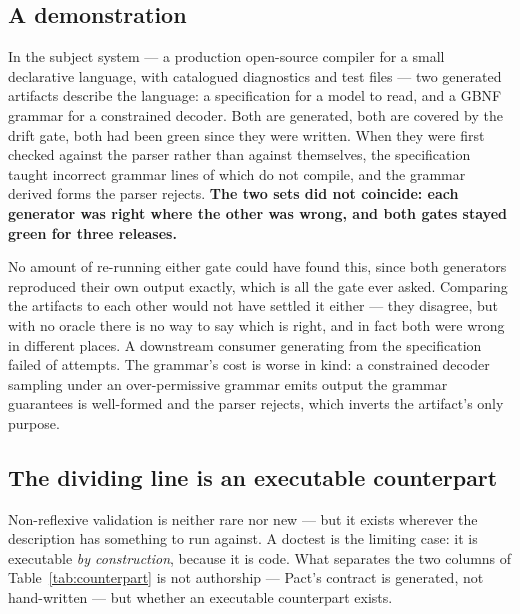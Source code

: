 \documentclass[10pt,conference]{IEEEtran}
\begin{document}
\subsection{A demonstration}

In the subject system --- a production open-source compiler for a small declarative
language, with \factErrorCodesTotal{} catalogued diagnostics and
\factTestFiles{} test files --- two generated artifacts describe the language: a
specification for a model to read, and a GBNF grammar for a constrained decoder. Both are
generated, both are covered by the drift gate, both had been green since they were
written. When they were first checked against the parser rather than against themselves,
the specification taught \factSpecBadLines{} incorrect grammar lines of which
\factSpecUncompilable{} do not compile, and the grammar derived
\factGbnfIllegalForms{} forms the parser rejects. \textbf{The two sets did not coincide:
each generator was right where the other was wrong, and both gates stayed green for three
releases.}

No amount of re-running either gate could have found this, since both generators
reproduced their own output exactly, which is all the gate ever asked. Comparing the
artifacts to each other would not have settled it either --- they disagree, but with no
oracle there is no way to say which is right, and in fact both were wrong in different
places. A downstream consumer generating from the specification failed
\factDownstreamFailed{} of \factDownstreamTotal{} attempts. The grammar's cost is worse in
kind: a constrained decoder sampling under an over-permissive grammar emits output the
grammar guarantees is well-formed and the parser rejects, which inverts the artifact's
only purpose.

\subsection{The dividing line is an executable counterpart}

Non-reflexive validation is neither rare nor new --- but it exists wherever the
description has something to run against. A doctest is the limiting case: it is
executable \emph{by construction}, because it is code. What separates the two columns of
Table~\ref{tab:counterpart} is not authorship --- Pact's contract is generated, not
hand-written --- but whether an executable counterpart exists.
\end{document}
